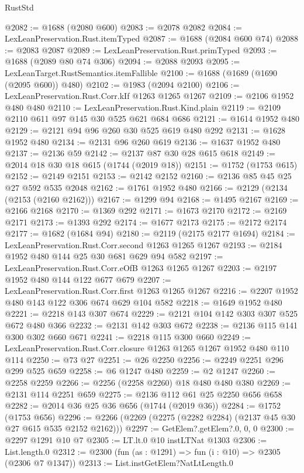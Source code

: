 \begin{lexlean}{RustStd}
\begin{coremodule}
@2082 := @1688 (@2080 @600)
@2083 := @2078 @2082
@2084 := LexLeanPreservation.Rust.itemTyped
@2087 := @1688 (@2084 @600 @74)
@2088 := @2083 @2087
@2089 := LexLeanPreservation.Rust.primTyped
@2093 := @1688 (@2089 @80 @74 @306)
@2094 := @2088 @2093
@2095 := LexLeanTarget.RustSemantics.itemFallible
@2100 := @1688 (@1689 (@1690 (@2095 @600)) @480)
@2102 := @1983 (@2094 @2100)
@2106 := LexLeanPreservation.Rust.Corr.kIf @1263 @1265 @1267
@2109 := @2106 @1952 @480 @480
@2110 := LexLeanPreservation.Rust.Kind.plain
@2119 := @2109 @2110 @611 @97 @145 @30 @525 @621 @684 @686
@2121 := @1614 @1952 @480
@2129 := @2121 @94 @96 @260 @30 @525 @619 @480 @292
@2131 := @1628 @1952 @480
@2134 := @2131 @96 @260 @619
@2136 := @1637 @1952 @480
@2137 := @2136 @59
@2142 := @2137 @87 @30 @28 @615 @618
@2149 := @2014 @18 @30 @18 @615 (@1744 (@2019 @18))
@2151 := @1752 (@1753 @615)
@2152 := @2149 @2151
@2153 := @2142 @2152
@2160 := @2136 @85 @45 @25 @27 @592 @535 @2048
@2162 := @1761 @1952 @480
@2166 := @2129 (@2134 (@2153 (@2160 @2162)))
@2167 := @1299 @94
@2168 := @1495 @2167
@2169 := @2166 @2168
@2170 := @1369 @292
@2171 := @1673 @2170
@2172 := @2169 @2171
@2173 := @1393 @292
@2174 := @1677 @2173
@2175 := @2172 @2174
@2177 := @1682 (@1684 @94)
@2180 := @2119 (@2175 @2177 @1694)
@2184 := LexLeanPreservation.Rust.Corr.second @1263 @1265 @1267
@2193 := @2184 @1952 @480 @144 @25 @30 @681 @629 @94 @582
@2197 := LexLeanPreservation.Rust.Corr.eOfB @1263 @1265 @1267
@2203 := @2197 @1952 @480 @144 @122 @677 @679
@2207 := LexLeanPreservation.Rust.Corr.first @1263 @1265 @1267
@2216 := @2207 @1952 @480 @143 @122 @306 @674 @629 @104 @582
@2218 := @1649 @1952 @480
@2221 := @2218 @143 @307 @674
@2229 := @2121 @104 @142 @303 @307 @525 @672 @480 @366
@2232 := @2131 @142 @303 @672
@2238 := @2136 @115 @141 @300 @302 @660 @671
@2241 := @2218 @115 @300 @660
@2249 := LexLeanPreservation.Rust.Corr.closure @1263 @1265 @1267 @1952 @480 @110 @114
@2250 := @73 @27
@2251 := @26 @2250
@2256 := @2249 @2251 @296 @299 @525 @659
@2258 := @6 @1247 @480
@2259 := @2 @1247
@2260 := @2258 @2259
@2266 := @2256 (@2258 @2260) @18 @480 @480 @380
@2269 := @2131 @114 @2251 @659
@2275 := @2136 @112 @61 @25 @2250 @656 @658
@2282 := @2014 @36 @25 @36 @656 (@1744 (@2019 @36))
@2284 := @1752 (@1753 @656)
@2296 := @2266 (@2269 (@2275 (@2282 @2284) (@2137 @45 @30 @27 @615 @535 @2152 @2162)))
@2297 := GetElem?.getElem?.{0, 0, 0}
@2300 := @2297 @1291 @10 @7
@2305 := LT.lt.{0} @10 instLTNat @1303
@2306 := List.length.{0}
@2312 := @2300 (fun (as : @1291) => fun (i : @10) => @2305 (@2306 @7 @1347))
@2313 := List.instGetElem?NatLtLength.{0}

\end{coremodule}
\end{lexlean}
